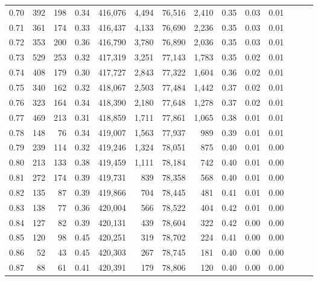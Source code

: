 \begin{tabular}{rrrrrrrrrrrrrr}
0.70 &     392 &    198 &  0.34 &  416,076 &    4,494 &  76,516 &   2,410 &  0.35 &  0.03 &      0.01 \\
0.71 &     361 &    174 &  0.33 &  416,437 &    4,133 &  76,690 &   2,236 &  0.35 &  0.03 &      0.01 \\
0.72 &     353 &    200 &  0.36 &  416,790 &    3,780 &  76,890 &   2,036 &  0.35 &  0.03 &      0.01 \\
0.73 &     529 &    253 &  0.32 &  417,319 &    3,251 &  77,143 &   1,783 &  0.35 &  0.02 &      0.01 \\
0.74 &     408 &    179 &  0.30 &  417,727 &    2,843 &  77,322 &   1,604 &  0.36 &  0.02 &      0.01 \\
0.75 &     340 &    162 &  0.32 &  418,067 &    2,503 &  77,484 &   1,442 &  0.37 &  0.02 &      0.01 \\
0.76 &     323 &    164 &  0.34 &  418,390 &    2,180 &  77,648 &   1,278 &  0.37 &  0.02 &      0.01 \\
0.77 &     469 &    213 &  0.31 &  418,859 &    1,711 &  77,861 &   1,065 &  0.38 &  0.01 &      0.01 \\
0.78 &     148 &     76 &  0.34 &  419,007 &    1,563 &  77,937 &     989 &  0.39 &  0.01 &      0.01 \\
0.79 &     239 &    114 &  0.32 &  419,246 &    1,324 &  78,051 &     875 &  0.40 &  0.01 &      0.00 \\
0.80 &     213 &    133 &  0.38 &  419,459 &    1,111 &  78,184 &     742 &  0.40 &  0.01 &      0.00 \\
0.81 &     272 &    174 &  0.39 &  419,731 &      839 &  78,358 &     568 &  0.40 &  0.01 &      0.00 \\
0.82 &     135 &     87 &  0.39 &  419,866 &      704 &  78,445 &     481 &  0.41 &  0.01 &      0.00 \\
0.83 &     138 &     77 &  0.36 &  420,004 &      566 &  78,522 &     404 &  0.42 &  0.01 &      0.00 \\
0.84 &     127 &     82 &  0.39 &  420,131 &      439 &  78,604 &     322 &  0.42 &  0.00 &      0.00 \\
0.85 &     120 &     98 &  0.45 &  420,251 &      319 &  78,702 &     224 &  0.41 &  0.00 &      0.00 \\
0.86 &      52 &     43 &  0.45 &  420,303 &      267 &  78,745 &     181 &  0.40 &  0.00 &      0.00 \\
0.87 &      88 &     61 &  0.41 &  420,391 &      179 &  78,806 &     120 &  0.40 &  0.00 &      0.00 \\

\end{tabular}
